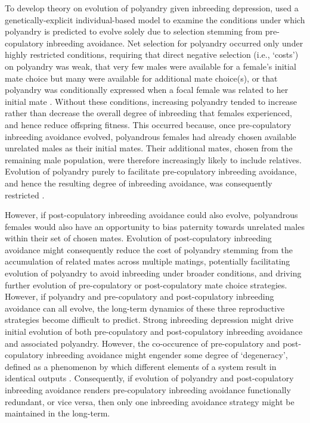 \documentclass[10pt,letterpaper]{article}
\begin{document}
To develop theory on evolution of polyandry given inbreeding depression, \cite{Duthie} used a genetically-explicit individual-based model to examine the conditions under which polyandry is predicted to evolve solely due to selection stemming from pre-copulatory inbreeding avoidance. Net selection for polyandry occurred only under highly restricted conditions, requiring that direct negative selection (i.e., `costs') on polyandry was weak, that very few males were available for a female's initial mate choice but many were available for additional mate choice(s), or that polyandry was conditionally expressed when a focal female was related to her initial mate \cite[][]{Duthie}. Without these conditions, increasing polyandry tended to increase rather than decrease the overall degree of inbreeding that females experienced, and hence reduce offspring fitness. This occurred because, once pre-copulatory inbreeding avoidance evolved, polyandrous females had already chosen available unrelated males as their initial mates. Their additional mates, chosen from the remaining male population, were therefore increasingly likely to include relatives. Evolution of polyandry purely to facilitate pre-copulatory inbreeding avoidance, and hence the resulting degree of inbreeding avoidance, was consequently restricted \cite[][]{Duthie}.

However, if post-copulatory inbreeding avoidance could also evolve, polyandrous females would also have an opportunity to bias paternity towards unrelated males within their set of chosen mates. Evolution of post-copulatory inbreeding avoidance might consequently reduce the cost of polyandry stemming from the accumulation of related mates across multiple matings, potentially facilitating evolution of polyandry to avoid inbreeding under broader conditions, and driving further evolution of pre-copulatory or post-copulatory mate choice strategies. However, if polyandry and pre-copulatory and post-copulatory inbreeding avoidance can all evolve, the long-term dynamics of these three reproductive strategies become difficult to predict. Strong inbreeding depression might drive initial evolution of both pre-copulatory and post-copulatory inbreeding avoidance and associated polyandry. However, the co-occurence of pre-copulatory and post-copulatory inbreeding avoidance might engender some degree of `degeneracy', defined as a phenomenon by which different elements of a system result in identical outputs \cite[i.e.,][]{Edelman2001}. Consequently, if evolution of polyandry and post-copulatory inbreeding avoidance renders pre-copulatory inbreeding avoidance functionally redundant, or vice versa, then only one inbreeding avoidance strategy might be maintained in the long-term.
\end{document}
